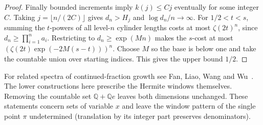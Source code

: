 \documentclass[11pt]{article}
\theoremstyle{definition}
\theoremstyle{remark}
\newcommand{\Q}{\mathbb{Q}}
\begin{document}
\begin{proof}
Finally bounded increments imply $k(j)\le Cj$ eventually for some
integer $C$. Taking $j=\lfloor n/(2C)\rfloor$ gives $d_n>H_j$ and
$\log d_n/n\to\infty$. For $1/2<t<s$, summing the $t$-powers of
all level-$n$ cylinder lengths costs at most $\zeta(2t)^n$, since
$d_n\ge\prod_{i=1}^n a_i$. Restricting to $d_n\ge\exp(Mn)$ makes
the $s$-cost at most $(\zeta(2t)\exp(-2M(s-t)))^n$. Choose $M$
so the base is below one and take the countable union over starting
indices. This gives the upper bound $1/2$.
\end{proof}
For related spectra of continued-fraction growth see Fan, Liao, Wang
and Wu~\cite{FLLW}. The lower constructions here prescribe the
Hermite windows themselves. Removing the countable set $\Q+\Q e$
leaves both dimensions unchanged. These statements concern sets of
variable $x$ and leave the window pattern of the single point $\pi$
undetermined (translation by its integer part preserves denominators).
\end{document}
